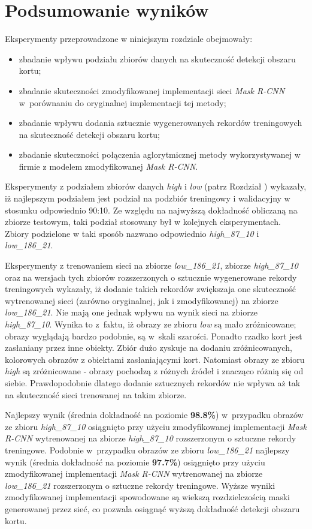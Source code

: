 \section{Podsumowanie wyników}

Eksperymenty przeprowadzone w niniejszym rozdziale obejmowały:
\begin{itemize}
 \item zbadanie wpływu podziału zbiorów danych na skuteczność detekcji obszaru kortu;
 \item zbadanie skuteczności zmodyfikowanej implementacji sieci \textit{Mask R-CNN} w~porównaniu do oryginalnej implementacji tej metody;
 \item zbadanie wpływu dodania sztucznie wygenerowanych rekordów treningowych na skuteczność detekcji obszaru kortu;
 \item zbadanie skuteczności połączenia aglorytmicznej metody wykorzystywanej w firmie \blue{} z modelem zmodyfikowanej \textit{Mask R-CNN}.
\end{itemize}

Eksperymenty z podziałem zbiorów danych \textit{high} i \textit{low} (patrz Rozdział ) wykazały, iż najlepszym podziałem jest podział na podzbiór treningowy i walidacyjny w stosunku odpowiednio 90:10. Ze względu na najwyższą dokładność obliczaną na zbiorze testowym, taki podział stosowany był w kolejnych eksperymentach. Zbiory podzielone w taki sposób nazwano odpowiednio \textit{high\_87\_10} i \textit{low\_186\_21}.

Eksperymenty z trenowaniem sieci na zbiorze \textit{low\_186\_21}, zbiorze \textit{high\_87\_10} oraz na wersjach tych zbiorów rozszerzonych o sztucznie wygenerowane rekordy treningowych wykazały, iż dodanie takich rekordów zwiększaja one skuteczność wytrenowanej sieci (zarówno oryginalnej, jak i zmodyfikowanej) na zbiorze \textit{low\_186\_21}. Nie mają one jednak wpływu na wynik sieci na zbiorze \textit{high\_87\_10}. Wynika to z~faktu, iż obrazy ze zbioru \textit{low} są mało zróżnicowane; obrazy wyglądają bardzo podobnie, są w~skali szarości. Ponadto rzadko kort jest zasłaniany przez inne obiekty. Zbiór dużo zyskuje na dodaniu zróżnicowanych, kolorowych obrazów z obiektami zasłaniającymi kort. Natomiast obrazy ze zbioru \textit{high} są zróżnicowane - obrazy pochodzą z różnych źródeł i znacząco różnią się od siebie. Prawdopodobnie dlatego dodanie sztucznych rekordów nie wpływa aż tak na skuteczność sieci trenowanej na takim zbiorze.


Najlepszy wynik (średnia dokładność na poziomie \textbf{98.8\%}) w~przypadku obrazów ze zbioru \textit{high\_87\_10} osiągnięto przy użyciu zmodyfikowanej implementacji \textit{Mask R-CNN} wytrenowanej na zbiorze \textit{high\_87\_10} rozszerzonym o sztuczne rekordy treningowe. Podobnie w~przypadku obrazów ze zbioru \textit{low\_186\_21} najlepszy wynik (średnia dokładność na poziomie \textbf{97.7\%}) osiągnięto przy użyciu zmodyfikowanej implementacji \textit{Mask R-CNN} wytrenowanej na zbiorze \textit{low\_186\_21} rozszerzonym o sztuczne rekordy treningowe. Wyższe wyniki zmodyfikowanej implementacji spowodowane są wiekszą rozdzielczością maski generowanej przez sieć, co pozwala osiągnąć wyższą dokładność detekcji obszaru kortu.

